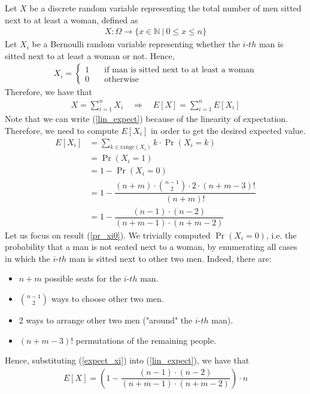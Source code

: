 Let $X$ be a discrete random variable representing the total number of men sitted next to at least a woman, defined as
\begin{align*}
	X: \Omega \rightarrow \{ x \in \mathbb{N} \ | \ 0 \leq x \leq n \}
\end{align*}
Let $X_i$ be a Bernoulli random variable representing whether the $i\text{-} th$ man is sitted next to at least a woman or not. Hence,
\begin{align*}
	X_i = 
	\left\{ \begin{aligned}
		1 &\quad\text{if man is sitted next to at least a woman}\\
		0 &\quad\text{otherwise}
	\end{aligned}\right.
\end{align*}
Therefore, we have that
\begin{align}
	X = \sum_{i = 1}^{n}X_i \quad\Rightarrow\quad E\left[ X \right] = \sum_{i = 1}^{n} E\left[ X_i \right] \label{lin_expect}
\end{align}
Note that we can write (\ref{lin_expect}) because of the linearity of expectation.\\
Therefore, we need to compute $E\left[ X_i \right]$ in order to get the desired expected value.
\begin{align}
	E\left[ X_i \right] &= \sum_{k \in \mathrm{range}(X_i)} k \cdot \Pr(X_i = k)\nonumber\\
	&= \Pr(X_i = 1)\nonumber\\
	&= 1 - \Pr(X_i = 0)\nonumber\\
	&= 1 - \dfrac{(n+m) \cdot \binom{n-1}{2} \cdot 2 \cdot (n+m-3)!}{(n+m)!} \label{pr_xi0}\\
	&= 1 - \dfrac{(n-1) \cdot (n-2)}{(n+m-1) \cdot (n+m-2)} \label{expect_xi}
\end{align}
Let us focus on result (\ref{pr_xi0}). We trivially computed $\Pr(X_i = 0)$, i.e. the probability that a man is not seated next to a woman, by enumerating all cases in which the $i \text{-} th$ man is sitted next to other two men. Indeed, there are:
\begin{itemize}
	\item $n+m$ possible seats for the $i \text{-} th$ man.
	\item $\binom{n-1}{2}$ ways to choose other two men.
	\item 2 ways to arrange other two men ("around" the $i \text{-} th$ man).
	\item $(n+m-3)!$ permutations of the remaining people.
\end{itemize}
Hence, substituting (\ref{expect_xi}) into (\ref{lin_expect}), we have that
\begin{align*}
	E\left[ X \right] = \left( 1 - \dfrac{(n-1) \cdot (n-2)}{(n+m-1) \cdot (n+m-2)} \right) \cdot n
\end{align*}
